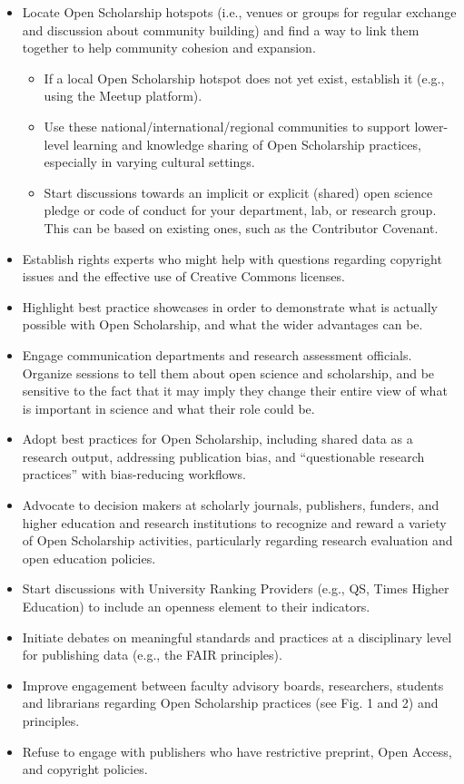 \documentclass[]{article}
\begin{document}
\begin{itemize}
\item
  Locate Open Scholarship hotspots (i.e., venues or groups for regular
  exchange and discussion about community building) and find a way to
  link them together to help community cohesion and expansion.

  \begin{itemize}
  \item
    If a local Open Scholarship hotspot does not yet exist, establish it
    (e.g., using the Meetup platform).
  \item
    Use these national/international/regional communities to support
    lower-level learning and knowledge sharing of Open Scholarship
    practices, especially in varying cultural settings.
  \item
    Start discussions towards an implicit or explicit (shared) open
    science pledge or code of conduct for your department, lab, or
    research group. This can be based on existing ones, such as the
    Contributor Covenant.
  \end{itemize}
\item
  Establish rights experts who might help with questions regarding
  copyright issues and the effective use of Creative Commons licenses.
\item
  Highlight best practice showcases in order to demonstrate what is
  actually possible with Open Scholarship, and what the wider advantages
  can be.
\item
  Engage communication departments and research assessment officials.
  Organize sessions to tell them about open science and scholarship, and
  be sensitive to the fact that it may imply they change their entire
  view of what is important in science and what their role could be.
\item
  Adopt best practices for Open Scholarship, including shared data as a
  research output, addressing publication bias, and ``questionable
  research practices'' with bias-reducing workflows.
\item
  Advocate to decision makers at scholarly journals, publishers,
  funders, and higher education and research institutions to recognize
  and reward a variety of Open Scholarship activities, particularly
  regarding research evaluation and open education policies.
\item
  Start discussions with University Ranking Providers (e.g., QS, Times
  Higher Education) to include an openness element to their indicators.
\item
  Initiate debates on meaningful standards and practices at a
  disciplinary level for publishing data (e.g., the FAIR principles).
\item
  Improve engagement between faculty advisory boards, researchers,
  students and librarians regarding Open Scholarship practices (see Fig.
  1 and 2) and principles.
\item
  Refuse to engage with publishers who have restrictive preprint, Open
  Access, and copyright policies.
\end{itemize}
\end{document}
